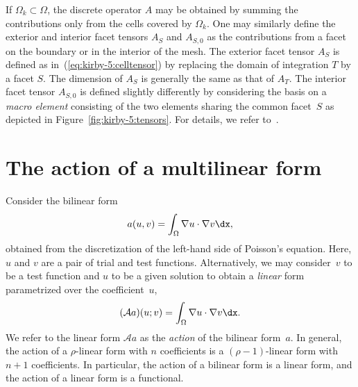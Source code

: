 If $\Omega_k \subset \Omega$, the discrete operator $A$ may be
obtained by summing the contributions only from the cells covered by
$\Omega_k$. One may similarly define the exterior and interior facet
tensors $A_S$ and $A_{S,0}$ as the contributions from a facet on the
boundary or in the interior of the mesh. The exterior facet tensor
$A_S$ is defined as in~(\ref{eq:kirby-5:celltensor}) by replacing the
domain of integration $T$ by a facet $S$. The dimension of $A_S$ is
generally the same as that of $A_T$. The interior facet tensor
$A_{S,0}$ is defined slightly differently by considering the basis on
a \emph{macro element} consisting of the two elements sharing the
common facet~$S$ as depicted in Figure~\ref{fig:kirby-5:tensors}. For
details, we refer to~\citet{OlgaardLoggWells2008}.

\section{The action of a multilinear form}

Consider the bilinear form
\begin{equation}
  a(u, v) = \int_{\Omega} \nabla u \cdot \nabla v \dx,
\end{equation}
obtained from the discretization of the left-hand side of Poisson's
equation. Here, $u$ and $v$ are a pair of trial and test functions.
Alternatively, we may consider~$v$ to be a test function and $u$ to be
a given solution to obtain a \emph{linear} form parametrized over the
coefficient~$u$,
\begin{equation}
  (\mathcal{A} a) (u; v) = \int_{\Omega} \nabla u \cdot \nabla v \dx.
\end{equation}
We refer to the linear form $\mathcal{A}a$ as the \emph{action} of the
bilinear form~$a$. In general, the action of a $\rho$-linear form with
$n$ coefficients is a $(\rho-1)$-linear form with $n+1$ coefficients.
In particular, the action of a bilinear form is a linear form, and the
action of a linear form is a functional.

